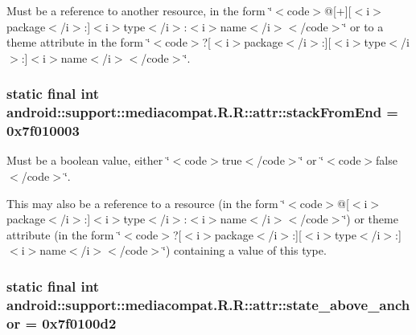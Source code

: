 Must be a reference to another resource, in the form \char`\"{}$<$code$>$@\mbox{[}+\mbox{]}\mbox{[}$<$i$>$package$<$/i$>$:\mbox{]}$<$i$>$type$<$/i$>$:$<$i$>$name$<$/i$>$$<$/code$>$\char`\"{} or to a theme attribute in the form \char`\"{}$<$code$>$?\mbox{[}$<$i$>$package$<$/i$>$:\mbox{]}\mbox{[}$<$i$>$type$<$/i$>$:\mbox{]}$<$i$>$name$<$/i$>$$<$/code$>$\char`\"{}. \hypertarget{classandroid_1_1support_1_1mediacompat_1_1_r_1_1attr_8412aa91d8c236d7be7a0af2406d0344}{
\subsubsection[{stackFromEnd}]{\setlength{\rightskip}{0pt plus 5cm}static final int android::support::mediacompat.R.R::attr::stackFromEnd = 0x7f010003}}
\label{classandroid_1_1support_1_1mediacompat_1_1_r_1_1attr_8412aa91d8c236d7be7a0af2406d0344}


Must be a boolean value, either \char`\"{}$<$code$>$true$<$/code$>$\char`\"{} or \char`\"{}$<$code$>$false$<$/code$>$\char`\"{}. 

This may also be a reference to a resource (in the form \char`\"{}$<$code$>$@\mbox{[}$<$i$>$package$<$/i$>$:\mbox{]}$<$i$>$type$<$/i$>$:$<$i$>$name$<$/i$>$$<$/code$>$\char`\"{}) or theme attribute (in the form \char`\"{}$<$code$>$?\mbox{[}$<$i$>$package$<$/i$>$:\mbox{]}\mbox{[}$<$i$>$type$<$/i$>$:\mbox{]}$<$i$>$name$<$/i$>$$<$/code$>$\char`\"{}) containing a value of this type. \hypertarget{classandroid_1_1support_1_1mediacompat_1_1_r_1_1attr_64d692a8fda5f907c7d3f4f98c71d256}{
\subsubsection[{state\_\-above\_\-anchor}]{\setlength{\rightskip}{0pt plus 5cm}static final int android::support::mediacompat.R.R::attr::state\_\-above\_\-anchor = 0x7f0100d2}}
\label{classandroid_1_1support_1_1mediacompat_1_1_r_1_1attr_64d692a8fda5f907c7d3f4f98c71d256}


